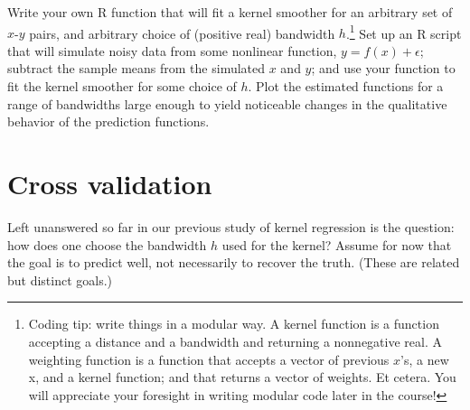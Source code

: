 \documentclass{mynotes}
\begin{document}
\begin{enumerate}[(A)]
Write your own R function that will fit a kernel smoother for an arbitrary set of $x$-$y$ pairs, and arbitrary choice of (positive real) bandwidth $h$.\footnote{Coding tip: write things in a modular way.  A kernel function is a function accepting a distance and a bandwidth and returning a nonnegative real.  A weighting function is a function that accepts a vector of previous $x$'s, a new x, and a kernel function; and that returns a vector of weights.  Et cetera.  You will appreciate your foresight in writing modular code later in the course!}  Set up an R script that will simulate noisy data from some nonlinear function, $y = f(x) + \epsilon$; subtract the sample means from the simulated $x$ and $y$; and use your function to fit the kernel smoother for some choice of $h$.  Plot the estimated functions for a range of bandwidths large enough to yield noticeable changes in the qualitative behavior of the prediction functions.

\end{enumerate}

\section{Cross validation}

Left unanswered so far in our previous study of kernel regression is the question: how does one choose the bandwidth $h$ used for the kernel?  Assume for now that the goal is to predict well, not necessarily to recover the truth.  (These are related but distinct goals.)  
\end{document}
